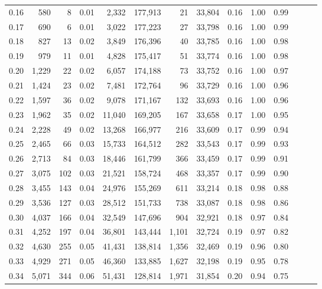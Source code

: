 \begin{tabular}{rrrrrrrrrrrrrr}
0.16 &    580 &      8 &  0.01 &    2,332 &  177,913 &      21 &  33,804 &  0.16 &  1.00 &      0.99 \\
0.17 &    690 &      6 &  0.01 &    3,022 &  177,223 &      27 &  33,798 &  0.16 &  1.00 &      0.99 \\
0.18 &    827 &     13 &  0.02 &    3,849 &  176,396 &      40 &  33,785 &  0.16 &  1.00 &      0.98 \\
0.19 &    979 &     11 &  0.01 &    4,828 &  175,417 &      51 &  33,774 &  0.16 &  1.00 &      0.98 \\
0.20 &  1,229 &     22 &  0.02 &    6,057 &  174,188 &      73 &  33,752 &  0.16 &  1.00 &      0.97 \\
0.21 &  1,424 &     23 &  0.02 &    7,481 &  172,764 &      96 &  33,729 &  0.16 &  1.00 &      0.96 \\
0.22 &  1,597 &     36 &  0.02 &    9,078 &  171,167 &     132 &  33,693 &  0.16 &  1.00 &      0.96 \\
0.23 &  1,962 &     35 &  0.02 &   11,040 &  169,205 &     167 &  33,658 &  0.17 &  1.00 &      0.95 \\
0.24 &  2,228 &     49 &  0.02 &   13,268 &  166,977 &     216 &  33,609 &  0.17 &  0.99 &      0.94 \\
0.25 &  2,465 &     66 &  0.03 &   15,733 &  164,512 &     282 &  33,543 &  0.17 &  0.99 &      0.93 \\
0.26 &  2,713 &     84 &  0.03 &   18,446 &  161,799 &     366 &  33,459 &  0.17 &  0.99 &      0.91 \\
0.27 &  3,075 &    102 &  0.03 &   21,521 &  158,724 &     468 &  33,357 &  0.17 &  0.99 &      0.90 \\
0.28 &  3,455 &    143 &  0.04 &   24,976 &  155,269 &     611 &  33,214 &  0.18 &  0.98 &      0.88 \\
0.29 &  3,536 &    127 &  0.03 &   28,512 &  151,733 &     738 &  33,087 &  0.18 &  0.98 &      0.86 \\
0.30 &  4,037 &    166 &  0.04 &   32,549 &  147,696 &     904 &  32,921 &  0.18 &  0.97 &      0.84 \\
0.31 &  4,252 &    197 &  0.04 &   36,801 &  143,444 &   1,101 &  32,724 &  0.19 &  0.97 &      0.82 \\
0.32 &  4,630 &    255 &  0.05 &   41,431 &  138,814 &   1,356 &  32,469 &  0.19 &  0.96 &      0.80 \\
0.33 &  4,929 &    271 &  0.05 &   46,360 &  133,885 &   1,627 &  32,198 &  0.19 &  0.95 &      0.78 \\
0.34 &  5,071 &    344 &  0.06 &   51,431 &  128,814 &   1,971 &  31,854 &  0.20 &  0.94 &      0.75 \\

\end{tabular}

